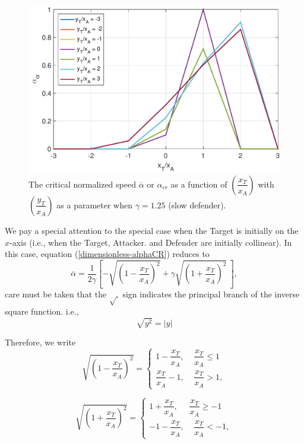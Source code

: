 \begin{figure}[htb]
\centering
\includegraphics[scale = 0.6]{fig/alphaCRg_1p25.pdf}
\caption{The critical normalized speed $\overline{\alpha}$ or $\alpha_{cr}$ as a function of $(\dfrac{x_T}{x_A})$ with $(\dfrac{y_T}{x_A})$ as a parameter when $\gamma=1.25$ (slow defender).}
\label{alphaCRgamma=1.25}
\end{figure}



We pay a special attention to the special case when the Target is initially on the $x$-axis (i.e., when the Target, Attacker. and Defender are initially collinear). In this case, equation (\ref{dimensionless-alphaCR}) reduces to
\begin{equation}
\overline{\alpha} = \dfrac{1}{2 \gamma} [-\sqrt{(1-\dfrac{x_T}{x_A})^2}+ \gamma \sqrt{(1+\dfrac{x_T}{x_A})^2}\ ],
\end{equation}
care must be taken that the $\sqrt{\ }$ sign indicates the principal branch of the inverse square function. i.e., 
\begin{equation}
\sqrt{y^2} = \lvert y \rvert
\end{equation}

Therefore, we write
\begin{equation}
\sqrt{(1- \dfrac{x_T}{x_A})^2}=\begin{cases}
1-\dfrac{x_T}{x_A},\ \ \ \ \ \dfrac{x_T}{x_A}\leq1\\
\dfrac{x_T}{x_A}-1,\ \ \ \ \ \dfrac{x_T}{x_A}>1,
\end{cases}
\end{equation} 

\begin{equation}
\sqrt{(1+\dfrac{x_T}{x_A})^2}=\begin{cases}
1+\dfrac{x_T}{x_A},\ \ \ \ \ \ \dfrac{x_T}{x_A}\geq-1\\
-1-\dfrac{x_T}{x_A},\ \ \ \ \ \dfrac{x_T}{x_A}<-1,
\end{cases}
\end{equation}

